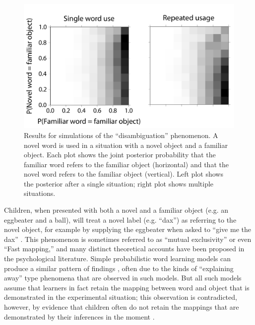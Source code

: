 \documentclass{article} %
\begin{document}
\begin{figure}
  \centering
\includegraphics[width=.6\textwidth]{figures/ME-composite-small.pdf}
  \caption{Results for simulations of the ``disambiguation'' phenomenon. A novel word is used in a situation with a novel object and a familiar object. Each plot shows the joint posterior probability that the familiar word refers to the familiar object (horizontal) and that the novel word refers to the familiar object (vertical). Left plot shows the posterior after a single situation; right plot shows multiple situations. 
}
  \label{fig:me}
\end{figure}

Children, when presented with both a novel and a familiar object (e.g. an eggbeater and a ball), will treat a novel label (e.g. ``dax'') as referring to the novel object, for example by supplying the eggbeater when asked to ``give me the dax'' \cite{markman1988}. This phenomenon is sometimes referred to as ``mutual exclusivity'' or even ``Fast mapping,'' and many distinct theoretical accounts have been proposed in the psychological literature. Simple probabilistic word learning models can produce a similar pattern of findings \cite{frank2009}, often due to the kinds of ``explaining away'' type phenomena that are observed in such models. But all such models assume that learners in fact retain the mapping between word and object that is demonstrated in the experimental situation; this observation is contradicted, however, by evidence that children often do not retain the mappings that are demonstrated by their inferences in the moment \cite{horst2008}. 
\end{document}
